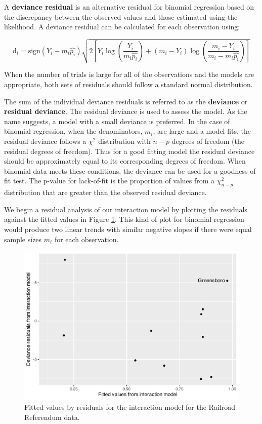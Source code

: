 \documentclass[
]{krantz}
\begin{document}
A \textbf{deviance residual}  is an alternative residual for binomial regression based on the discrepancy between the observed values and those estimated using the likelihood.
A deviance residual can be calculated for each observation using:

\begin{equation*}
\textrm{d}_i = 
\textrm{sign}(Y_i-m_i\hat{p_i})\sqrt{2[Y_i \log\left(\frac{Y_i}{m_i \hat{p_i}}\right)+
(m_i - Y_i) \log\left(\frac{m_i - Y_i}{m_i - m_i \hat{p_i}}\right)]}
\end{equation*}

When the number of trials is large for all of the observations and the models are appropriate, both sets of residuals should follow a standard normal distribution.

The sum of the individual deviance residuals is referred to as the \textbf{deviance} or \textbf{residual deviance}.  The residual deviance is used to assess the model. As the name suggests, a model with a small deviance is preferred. In the case of binomial regression, when the denominators, \(m_i\), are large and a model fits, the residual deviance follows a \(\chi^2\) distribution with \(n-p\) degrees of freedom (the residual degrees of freedom). Thus for a good fitting model the residual deviance should be approximately equal to its corresponding degrees of freedom. When binomial data meets these conditions, the deviance can be used for a goodness-of-fit test. The p-value for lack-of-fit is the proportion of values from a \(\chi_{n-p}^2\) distribution that are greater than the observed residual deviance.

We begin a residual analysis of our interaction model by plotting the residuals against the fitted values in Figure \ref{fig:resid}. This kind of plot for binomial regression would produce two linear trends with similar negative slopes if there were equal sample sizes \(m_i\) for each observation.

\begin{figure}

{\centering \includegraphics[width=0.6\linewidth]{bookdown-BeyondMLR_files/figure-latex/resid-1} 

}

\caption{Fitted values by residuals for the interaction model for the Railroad Referendum data.}\label{fig:resid}
\end{figure}
\end{document}
